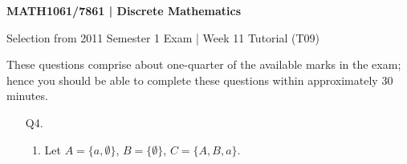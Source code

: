 \documentclass[a4paper,11pt]{article}
\newcommand{\R}{\mathbb{R}}
\begin{document}
\begin{center}
\bf
MATH1061/7861 | Discrete Mathematics

Selection from 2011 Semester 1 Exam | Week 11 Tutorial (T09)
\end{center}

These questions comprise about one-quarter of the available marks in the exam;
hence you should be able to complete these questions within approximately 30
minutes.

\begin{enumerate}



\item[Q4.]
\begin{enumerate}
\item
Let $A = \{a, \emptyset\}$, $B = \{\emptyset\}$, $C = \{A, B, a\}$.


\end{enumerate}
\end{enumerate}
\end{document}
